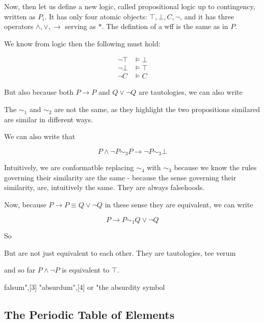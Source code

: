 Now, then let us define a new logic, called propositional logic up to contingency, 
written as $P_i$. It has only four atomic objects: $\top, \bot, C, \neg$, and it has three operators $\wedge, \vee, \rightarrow$ serving as $*$. The defintion of a wff is the same as in $P$. 

We know from logic then the following must hold: 

\begin{align*}
\neg \top &\models \bot \\
\neg \bot &\models \top \\
\neg C &\models C
\end{align*}






But also because both $P \rightarrow P$ and $Q \vee \neg Q$ are tautologies, we can also write 



The $\sim_{1}$ and $\sim_{2}$ are not the same, as they highlight the two propositions similared are similar in different ways. 

We can also write that 

$$P \wedge \neg P \sim_{3} P\rightarrow \neg P \sim_{3} \bot$$



Intuitively, we are conformatble replacing $\sim_{4}$ with $\sim_{3}$ because we know the rules governing their similarity are the same - because the sense governing their similarity, are, intuitively the same. They are always falsehoods. 







Now, because $P \rightarrow P \equiv Q \vee \neg Q$ in these sense they are equivalent, we can write 

$$P \rightarrow P \sim_{1} Q \vee \neg Q$$





So 


But are not just equivalent to each other. They are tautologies, tee verum



and so far $P \wedge \neg P$ is equivalent to $\top$. 

falsum",[3] "absurdum",[4] or "the absurdity symbol

\subsection{The Periodic Table of Elements}

